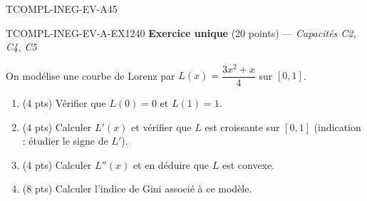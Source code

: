 

\begin{evaluation}{TCOMPL-INEG-EV-A}{45}

\begin{exercice}{TCOMPL-INEG-EV-A-EX1}{2}{40}
\textbf{Exercice unique} (20 points) --- \textit{Capacités C2, C4, C5}

\medskip

On modélise une courbe de Lorenz par $L(x) = \dfrac{3x^2+x}{4}$ sur $[0,1]$.
\begin{enumerate}
  \item (4 pts) Vérifier que $L(0)=0$ et $L(1)=1$.
  \item (4 pts) Calculer $L'(x)$ et vérifier que $L$ est croissante sur $[0,1]$ (indication : étudier le signe de $L'$).
  \item (4 pts) Calculer $L''(x)$ et en déduire que $L$ est convexe.
  \item (8 pts) Calculer l'indice de Gini associé à ce modèle.
\end{enumerate}
\end{exercice}

\end{evaluation}
